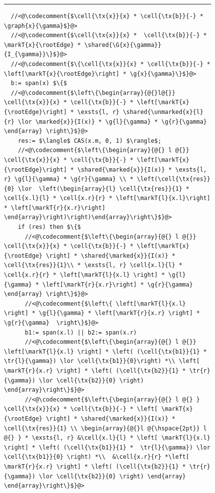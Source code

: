\begin{figure}
\hrule     
\begin{lstlisting}
  //<@\codecomment{$\cell{\tx{x}}{x} * \cell{\tx{b}}{-} * \graph{x}{\gamma}$}@>
  //<@\codecomment{$\cell{\tx{x}}{x} *  \cell{\tx{b}}{-} * \markT{x}{\rootEdge} * \shared{\G{x}{\gamma}}{I_{\gamma}}\}$}@>
  //<@\codecomment{$\{\cell{\tx{x}}{x} * \cell{\tx{b}}{-} * \left[\markT{x}{\rootEdge}\right] * \g{x}{\gamma}\}$}@>
  b:= span(x) $\{$
  //<@\codecomment{$\left\{\begin{array}{@{}l@{}} \cell{\tx{x}}{x} * \cell{\tx{b}}{-} * \left[\markT{x}{\rootEdge}\right] * \exsts{l, r} \shared{\unmarked{x}{l}{r} \lor \marked{x}}{I(x)} * \g{l}{\gamma} * \g{r}{\gamma} \end{array} \right\}$}@>
    res:= $\langle$ CAS(x.m, 0, 1) $\rangle$;
    //<@\codecomment{$\left\{\begin{array}{@{} l @{}} \cell{\tx{x}}{x} * \cell{\tx{b}}{-} * \left[\markT{x}{\rootEdge}\right] * \shared{\marked{x}}{I(x)} * \exsts{l, r} \g{l}{\gamma} * \g{r}{\gamma} \\ * \left(\cell{\tx{res}}{0} \lor  \left(\begin{array}{l} \cell{\tx{res}}{1} * \cell{x.l}{l} * \cell{x.r}{r} * \left[\markT{l}{x.l}\right] * \left[\markT{r}{x.r}\right] \end{array}\right)\right)\end{array}\right\}$}@>
    if (res) then $\{$ 
      //<@\codecomment{$\left\{\begin{array}{@{} l @{}} \cell{\tx{x}}{x} * \cell{\tx{b}}{-} * \left[\markT{x}{\rootEdge} \right] * \shared{\marked{x}}{I(x)} * \cell{\tx{res}}{1}\\ * \exsts{l, r} \cell{x.l}{l} * \cell{x.r}{r} * \left[\markT{l}{x.l} \right] * \g{l}{\gamma} * \left[\markT{r}{x.r}\right] * \g{r}{\gamma}  \end{array} \right\}$}@>
      //<@\codecomment{$\left\{ \left[\markT{l}{x.l} \right] * \g{l}{\gamma} * \left[\markT{r}{x.r} \right] * \g{r}{\gamma}  \right\}$}@>
      b1:= span(x.l) || b2:= span(x.r)
      //<@\codecomment{$\left\{\begin{array}{@{} l @{}}  \left[\markT{l}{x.l} \right] * \left( (\cell{\tx{b1}}{1} *  \tr{l}{\gamma}) \lor \cell{\tx{b1}}{0}\right) *\\ \left[ \markT{r}{x.r} \right] * \left( (\cell{\tx{b2}}{1} * \tr{r}{\gamma}) \lor \cell{\tx{b2}}{0} \right)  \end{array}\right\}$}@>
      //<@\codecomment{$\left\{\begin{array}{@{} l @{} }  \cell{\tx{x}}{x} * \cell{\tx{b}}{-} * \left[ \markT{x}{\rootEdge} \right] * \shared{\marked{x}}{I(x)} * \cell{\tx{res}}{1} \\ \begin{array}{@{}l @{\hspace{2pt}} l @{} } * \exsts{l, r} &\cell{x.l}{l} * \left[ \markT{l}{x.l} \right] * \left( (\cell{\tx{b1}}{1} *  \tr{l}{\gamma}) \lor \cell{\tx{b1}}{0} \right) *\\  &\cell{x.r}{r} *\left[ \markT{r}{x.r} \right] * \left( (\cell{\tx{b2}}{1} * \tr{r}{\gamma}) \lor \cell{\tx{b2}}{0} \right) \end{array}   \end{array}\right\}$}@>

\end{lstlisting}
\end{figure}
